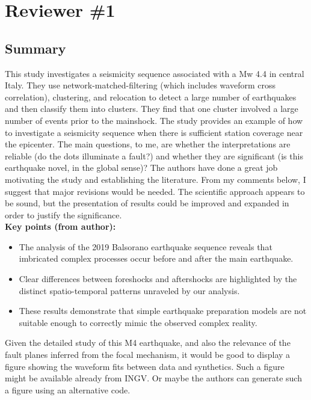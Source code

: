 \documentclass[10pt]{extarticle}
\begin{document}
\section*{Reviewer \#1}


\subsection*{Summary}

This study investigates a seismicity sequence associated with a Mw 4.4 in central Italy. They use network-matched-filtering (which includes waveform cross correlation), clustering, and relocation to detect a large number of earthquakes and then classify them into clusters. They find that one cluster involved a large number of events prior to the mainshock. The study provides an example of how to investigate a seismicity sequence when there is sufficient station coverage near the epicenter. The main questions, to me, are whether the interpretations are reliable (do the dots illuminate a fault?) and whether they are significant (is this earthquake novel, in the global sense)? The authors have done a great job motivating the study and establishing the literature. From my comments below, I suggest that major revisions would be needed. The scientific approach appears to be sound, but the presentation of results could be improved and expanded in order to justify the significance. \\

{\bf Key points (from author):} \\
\begin{itemize}
 \item[1] The analysis of the 2019 Balsorano earthquake sequence reveals that imbricated complex processes occur before and after the main earthquake. 
 \item[2] Clear differences between foreshocks and aftershocks are highlighted by the distinct spatio-temporal patterns unraveled by our analysis.
 \item[3] These results demonstrate that simple earthquake preparation models are not suitable enough to correctly mimic the observed complex reality.
\end{itemize}



\begin{ReviewerComment}{1}
\noindent 
Given the detailed study of this M4 earthquake, and also the relevance of the fault planes inferred from the focal mechanism, it would be good to display a figure showing the waveform fits between data and synthetics. Such a figure might be available already from INGV. Or maybe the authors can generate such a figure using an alternative code.
\end{ReviewerComment}
\end{document}
